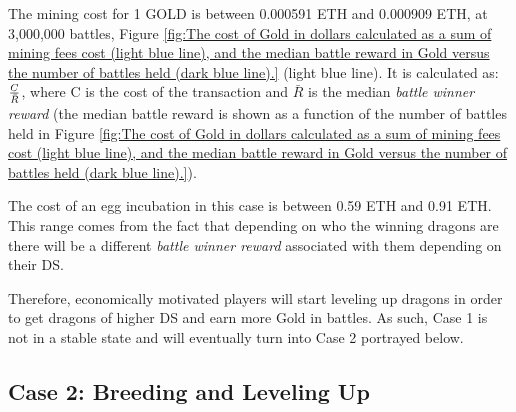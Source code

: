 \documentclass[12pt]{article}
\begin{document}
{The mining cost for 1 GOLD is between 0.000591 ETH and 0.000909 ETH, at 3,000,000 battles, Figure \ref{fig:The cost of Gold in dollars calculated as a sum of mining fees cost (light blue line), and the median battle reward in Gold versus the number of battles held (dark blue line).} (light blue line).  It is calculated as:  ${{C}\over{\bar R}}$, where C is the cost of the transaction and  $\bar R$ is the median \textit{battle winner reward} (the median battle reward is shown as a function of the number of battles held in Figure \ref{fig:The cost of Gold in dollars calculated as a sum of mining fees cost (light blue line), and the median battle reward in Gold versus the number of battles held (dark blue line).}).\par

The cost of an egg incubation in this case is between 0.59 ETH and 0.91 ETH. This range comes from the fact that depending on who the winning dragons are there will be a different \textit{battle winner reward} associated with them depending on their DS.\par

Therefore, economically motivated players will start leveling up dragons in order to get dragons of higher DS and earn more Gold in battles. As such, Case 1 is not in a stable state and will eventually turn into Case 2 portrayed below.\par


\subsection{Case 2: Breeding and Leveling Up}
\label{Case 2: Breeding and Leveling Up} \par




}
\end{document}
